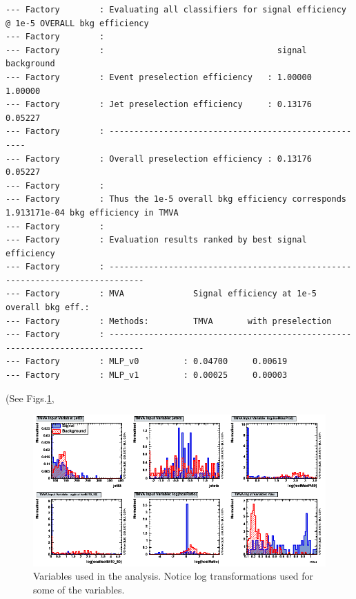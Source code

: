 \begin{verbatim}
--- Factory        : Evaluating all classifiers for signal efficiency @ 1e-5 OVERALL bkg efficiency
--- Factory        : 
--- Factory        :                                   signal   background
--- Factory        : Event preselection efficiency   : 1.00000  1.00000
--- Factory        : Jet preselection efficiency     : 0.13176  0.05227
--- Factory        : -----------------------------------------------------
--- Factory        : Overall preselection efficiency : 0.13176  0.05227
--- Factory        : 
--- Factory        : Thus the 1e-5 overall bkg efficiency corresponds 1.913171e-04 bkg efficiency in TMVA
--- Factory        : 
--- Factory        : Evaluation results ranked by best signal efficiency
--- Factory        : -----------------------------------------------------------------------------
--- Factory        : MVA              Signal efficiency at 1e-5 overall bkg eff.:
--- Factory        : Methods:         TMVA       with preselection
--- Factory        : -----------------------------------------------------------------------------
--- Factory        : MLP_v0         : 0.04700     0.00619
--- Factory        : MLP_v1         : 0.00025     0.00003

\end{verbatim}
\normalsize

(See Figs.\ref{fig:variables_c1},
 
\begin{figure}[h]
\begin{center}
\includegraphics[width=1.0\textwidth]{images/ahVariables_c1.png}
\caption{Variables used in the analysis. Notice log transformations used for some of the variables.}
\label{fig:variables_c1}
\end{center}
\end{figure}

